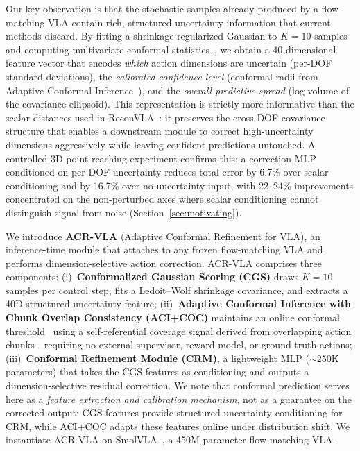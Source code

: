 Our key observation is that the stochastic samples already produced by a flow-matching VLA contain rich, structured uncertainty information that current methods discard.
By fitting a shrinkage-regularized Gaussian to $K{=}10$ samples and computing multivariate conformal statistics~\cite{braun2025cgs}, we obtain a 40-dimensional feature vector that encodes \emph{which} action dimensions are uncertain (per-DOF standard deviations), the \emph{calibrated confidence level} (conformal radii from Adaptive Conformal Inference~\cite{gibbs2021aci}), and the \emph{overall predictive spread} (log-volume of the covariance ellipsoid).
This representation is strictly more informative than the scalar distances used in ReconVLA~\cite{chen2026reconvla}: it preserves the cross-DOF covariance structure that enables a downstream module to correct high-uncertainty dimensions aggressively while leaving confident predictions untouched.
A controlled 3D point-reaching experiment confirms this: a correction MLP conditioned on per-DOF uncertainty reduces total error by 6.7\% over scalar conditioning and by 16.7\% over no uncertainty input, with 22--24\% improvements concentrated on the non-perturbed axes where scalar conditioning cannot distinguish signal from noise (Section~\ref{sec:motivating}).

We introduce \textbf{ACR-VLA} (Adaptive Conformal Refinement for VLA), an inference-time module that attaches to any frozen flow-matching VLA and performs dimension-selective action correction.
ACR-VLA comprises three components:
(i)~\textbf{Conformalized Gaussian Scoring (CGS)} draws $K{=}10$ samples per control step, fits a Ledoit--Wolf shrinkage covariance, and extracts a 40D structured uncertainty feature;
(ii)~\textbf{Adaptive Conformal Inference with Chunk Overlap Consistency (ACI+COC)} maintains an online conformal threshold~\cite{gibbs2021aci} using a self-referential coverage signal derived from overlapping action chunks---requiring no external supervisor, reward model, or ground-truth actions;
(iii)~\textbf{Conformal Refinement Module (CRM)}, a lightweight MLP (${\sim}$250K parameters) that takes the CGS features as conditioning and outputs a dimension-selective residual correction.
We note that conformal prediction serves here as a \emph{feature extraction and calibration mechanism}, not as a guarantee on the corrected output: CGS features provide structured uncertainty conditioning for CRM, while ACI+COC adapts these features online under distribution shift.
We instantiate ACR-VLA on SmolVLA~\cite{shukor2025smolvla}, a 450M-parameter flow-matching VLA.

